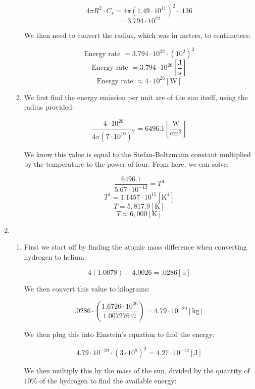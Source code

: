 \begin{enumerate}
\begin{enumerate}
        $$4\pi R^2\cdot C_s=4\pi(1.49\cdot10^{11})^2\cdot.136$$
        $$=3.794\cdot10^{22}$$

        We then need to convert the radius, which was in meters, to centimeters:

        $$\text{Energy rate } = 3.794\cdot10^{22}\cdot\left( 10^2 \right)^2$$
        $$\text{Energy rate } = 3.794\cdot10^{26}\left[ \frac{\si{\joule}}{\si{\second}} \right]$$
        $$\boxed{\text{Energy rate } \approx 4\cdot10^{26}\left[ \si{\watt}\right]}$$

      \item 

        We first find the energy emission per unit are of the sun itself, using the radius provided:

        $$\frac{4\cdot10^{26}}{4\pi(7\cdot10^{10})^2}=6496.1\left[ \frac{\si{\watt}}{\si{\centi\meter\squared}} \right]$$

        We know this value is equal to the Stefan-Boltzmann constant multiplied by the temperature to the power of four. From here, we can solve:

        $$\frac{6496.1}{5.67\cdot10^{-12}}=T^4$$
        $$T^4=1.1457\cdot10^{15}[\si{\kelvin}^4]$$
        $$T=5,817.9[\si{\kelvin}]$$
        $$\boxed{T\approx 6,000[\si{\kelvin}]}$$

    \end{enumerate}

    \setcounter{enumi}{3}

  \item

    \begin{enumerate}

      \item 

        First we start off by finding the atomic mass difference when converting hydrogen to helium:

        $$4(1.0078)-4.0026=.0286[\si{\amu}]$$

        We then convert this value to kilograms:

        $$.0286\cdot\left( \frac{1.6726\cdot10^{26}}{1.00727647} \right)=4.79\cdot10^{-29}[\si{\kilo\gram}]$$

        We then plug this into Einstein's equation to find the energy:

        $$4.79\cdot10^{-29}\cdot(3\cdot10^8)^2=4.27\cdot10^{-12}[\si{\joule}]$$

        We then multiply this by the mass of the sun, divided by the quantity of $10\%$ of the hydrogen to find the available energy:


\end{enumerate}
\end{enumerate}
